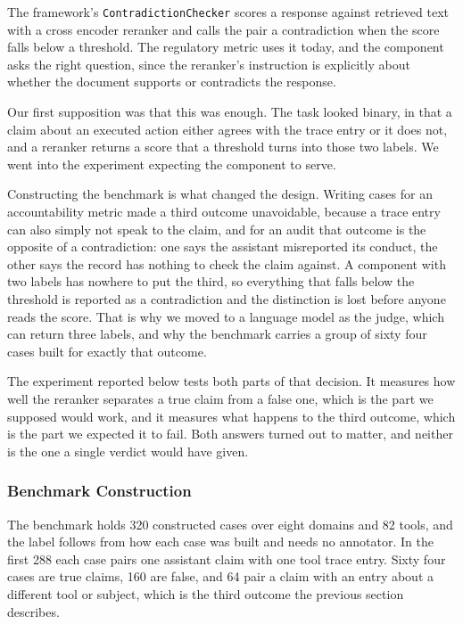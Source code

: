 \documentclass[11pt,a4paper]{article}
\begin{document}
The framework's \texttt{ContradictionChecker} scores a response against retrieved
text with a cross encoder reranker and calls the pair a contradiction when the score
falls below a threshold. The regulatory metric uses it today, and the component asks
the right question, since the reranker's instruction is explicitly about whether the
document supports or contradicts the response.

Our first supposition was that this was enough. The task looked binary, in that a
claim about an executed action either agrees with the trace entry or it does not, and
a reranker returns a score that a threshold turns into those two labels. We went into
the experiment expecting the component to serve.

Constructing the benchmark is what changed the design. Writing cases for an
accountability metric made a third outcome unavoidable, because a trace entry can
also simply not speak to the claim, and for an audit that outcome is the opposite of
a contradiction: one says the assistant misreported its conduct, the other says the
record has nothing to check the claim against. A component with two labels has
nowhere to put the third, so everything that falls below the threshold is reported as
a contradiction and the distinction is lost before anyone reads the score. That is
why we moved to a language model as the judge, which can return three labels, and why
the benchmark carries a group of sixty four cases built for exactly that outcome.

The experiment reported below tests both parts of that decision. It measures how well
the reranker separates a true claim from a false one, which is the part we supposed
would work, and it measures what happens to the third outcome, which is the part we
expected it to fail. Both answers turned out to matter, and neither is the one a
single verdict would have given.

\subsubsection{Benchmark Construction}

The benchmark holds 320 constructed cases over eight domains and 82 tools, and the
label follows from how each case was built and needs no annotator. In the first 288
each case pairs one assistant claim with one tool trace entry. Sixty four cases are true claims, 160
are false, and 64 pair a claim with an entry about a different tool or subject, which
is the third outcome the previous section describes.
\end{document}
